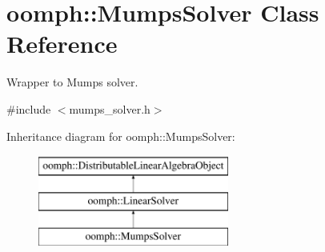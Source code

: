 \hypertarget{classoomph_1_1MumpsSolver}{}\section{oomph\+:\+:Mumps\+Solver Class Reference}
\label{classoomph_1_1MumpsSolver}


Wrapper to Mumps solver.  




{\ttfamily \#include $<$mumps\+\_\+solver.\+h$>$}

Inheritance diagram for oomph\+:\+:Mumps\+Solver\+:\begin{figure}[H]
\begin{center}
\leavevmode
\includegraphics[height=3.000000cm]{classoomph_1_1MumpsSolver}
\end{center}
\end{figure}
